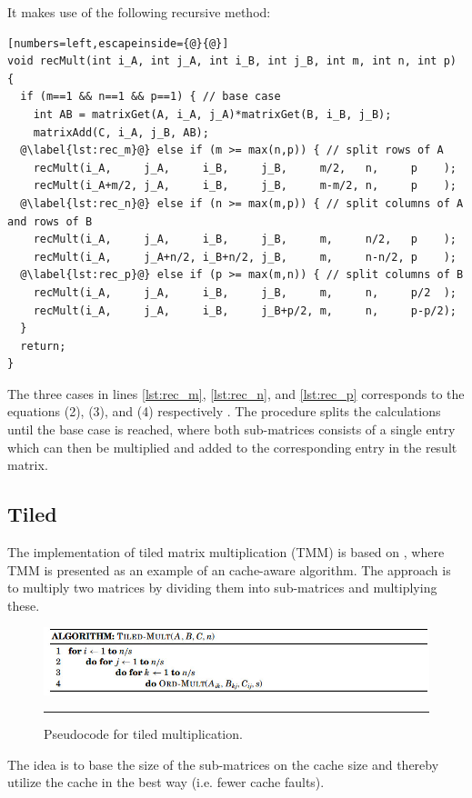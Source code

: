 It makes use of the following recursive method:
\begin{lstlisting}[numbers=left,escapeinside={@}{@}]
void recMult(int i_A, int j_A, int i_B, int j_B, int m, int n, int p) {
  if (m==1 && n==1 && p==1) { // base case
    int AB = matrixGet(A, i_A, j_A)*matrixGet(B, i_B, j_B);
    matrixAdd(C, i_A, j_B, AB);
  @\label{lst:rec_m}@} else if (m >= max(n,p)) { // split rows of A
    recMult(i_A,     j_A,     i_B,     j_B,     m/2,   n,     p    );
    recMult(i_A+m/2, j_A,     i_B,     j_B,     m-m/2, n,     p    );
  @\label{lst:rec_n}@} else if (n >= max(m,p)) { // split columns of A and rows of B
    recMult(i_A,     j_A,     i_B,     j_B,     m,     n/2,   p    );
    recMult(i_A,     j_A+n/2, i_B+n/2, j_B,     m,     n-n/2, p    );
  @\label{lst:rec_p}@} else if (p >= max(m,n)) { // split columns of B
    recMult(i_A,     j_A,     i_B,     j_B,     m,     n,     p/2  );
    recMult(i_A,     j_A,     i_B,     j_B+p/2, m,     n,     p-p/2);
  }
  return;
}
\end{lstlisting}

The three cases in lines \ref{lst:rec_m}, \ref{lst:rec_n}, and \ref{lst:rec_p} corresponds to the equations (2), (3), and (4) respectively \citep{matrixMultiplication}.
The procedure splits the calculations until the base case is reached, where both sub-matrices consists of a single entry which can then be multiplied and added to the corresponding entry in the result matrix.



\subsection{Tiled}
The implementation of tiled matrix multiplication (TMM) is based on \citep{matrixMultiplication}, where TMM is presented as an example of an cache-aware algorithm. 
The approach is to multiply two matrices by dividing them into sub-matrices and multiplying these. 
\begin{figure}[htbp]
	\centering
		\includegraphics[width=\textwidth]{./Figures/Project2a/TiledMulti_Pseudo.jpg}
		\rule{35em}{0.5pt}
	\caption[Pseudocode for tiled multiplication]{
	Pseudocode for tiled multiplication.
	}
	\label{fig:TiledMulti_Pseudo}
\end{figure}
The idea is to base the size of the sub-matrices on the cache size and thereby utilize the cache in the best way (i.e. fewer cache faults).   


